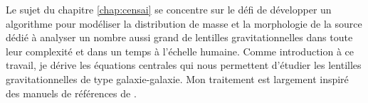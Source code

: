

Le sujet du chapitre \ref{chap:censai} se concentre sur le défi de développer un algorithme pour modéliser la distribution de masse et 
la morphologie de la source dédié à analyser un nombre aussi grand 
de lentilles gravitationnelles dans toute leur complexité et dans un temps à l'échelle humaine. 
Comme introduction à ce travail, je dérive les équations centrales qui nous permettent 
d'étudier les lentilles gravitationnelles de type galaxie-galaxie.
Mon traitement est largement inspiré 
des manuels de références de \citet{Meneghetti2013,Congdon2018}. 





